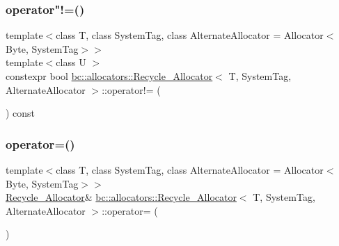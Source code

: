 \mbox{\label{structbc_1_1allocators_1_1Recycle__Allocator_aed4267489b64420fafbe56b68f3b349b}} 
\subsubsection{\texorpdfstring{operator"!=()}{operator!=()}}
{\footnotesize\ttfamily template$<$class T, class System\+Tag, class Alternate\+Allocator = Allocator$<$\+Byte, System\+Tag$>$$>$ \\
template$<$class U $>$ \\
constexpr bool \hyperlink{structbc_1_1allocators_1_1Recycle__Allocator}{bc\+::allocators\+::\+Recycle\+\_\+\+Allocator}$<$ T, System\+Tag, Alternate\+Allocator $>$\+::operator!= (\begin{DoxyParamCaption}\item[{const \hyperlink{structbc_1_1allocators_1_1Recycle__Allocator}{Recycle\+\_\+\+Allocator}$<$ U, System\+Tag, Alternate\+Allocator $>$ \&}]{ }\end{DoxyParamCaption}) const\hspace{0.3cm}{\ttfamily [inline]}}

\mbox{\label{structbc_1_1allocators_1_1Recycle__Allocator_ab4b0f33002a9d103d6212a7b9976d8a9}} 
\subsubsection{\texorpdfstring{operator=()}{operator=()}\hspace{0.1cm}{\footnotesize\ttfamily [1/2]}}
{\footnotesize\ttfamily template$<$class T, class System\+Tag, class Alternate\+Allocator = Allocator$<$\+Byte, System\+Tag$>$$>$ \\
\hyperlink{structbc_1_1allocators_1_1Recycle__Allocator}{Recycle\+\_\+\+Allocator}\& \hyperlink{structbc_1_1allocators_1_1Recycle__Allocator}{bc\+::allocators\+::\+Recycle\+\_\+\+Allocator}$<$ T, System\+Tag, Alternate\+Allocator $>$\+::operator= (\begin{DoxyParamCaption}\item[{const \hyperlink{structbc_1_1allocators_1_1Recycle__Allocator}{Recycle\+\_\+\+Allocator}$<$ T, System\+Tag, Alternate\+Allocator $>$ \&}]{ }\end{DoxyParamCaption})\hspace{0.3cm}{\ttfamily [default]}}

